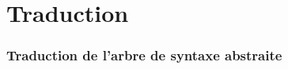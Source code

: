 \section{Traduction}

\begin{frame}
    \frametitle{Traduction de l'arbre de syntaxe abstraite\esp}
    
\end{frame}
